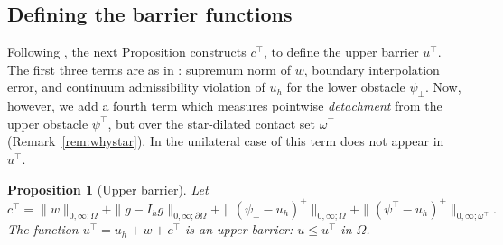 \documentclass[12pt]{amsart}
\numberwithin{equation}{section}
\theoremstyle{plain}
\newtheorem{proposition}[theorem]{Proposition}
\theoremstyle{definition}
\theoremstyle{remark}
\newcommand{\Om}{\Omega}
\newcommand{\dOm}{\partial\Omega}
\newcommand{\psilo}{\psi_\bot}
\newcommand{\psiup}{\psi^\top}
\newcommand{\Ih}{I_h}
\newcommand{\omtop}{\omega^\top}
\begin{document}
\subsection{Defining the barrier functions}  Following \cite[Proposition 4.1]{NSV03}, the next Proposition constructs $c^\top$, to define the upper barrier $u^\top$.  The first three terms are as in \cite{NSV03}: supremum norm of $w$, boundary interpolation error, and continuum admissibility violation of $u_h$ for the lower obstacle $\psilo$.  Now, however, we add a fourth term which measures pointwise \emph{detachment} from the upper obstacle $\psiup$, but over the star-dilated contact set $\omtop$ (Remark~\ref{rem:whystar}).  In the unilateral case of \cite[Proposition 4.1]{NSV03} this term does not appear in $u^\top$.

\begin{proposition}[Upper barrier]
\label{prop:upperbarrier}
Let
\begin{equation}
\label{eq:cupper}
  c^\top = \|w\|_{0,\infty;\Om} + \|g-\Ih g\|_{0,\infty;\dOm} + \|(\psilo-u_h)^+\|_{0,\infty;\Om} + \|(\psiup-u_h)^+\|_{0,\infty;\omtop}.
\end{equation}
The function $u^\top = u_h + w + c^\top$ is an upper barrier: $u \le u^\top$ in $\Om$.
\end{proposition}
\end{document}
